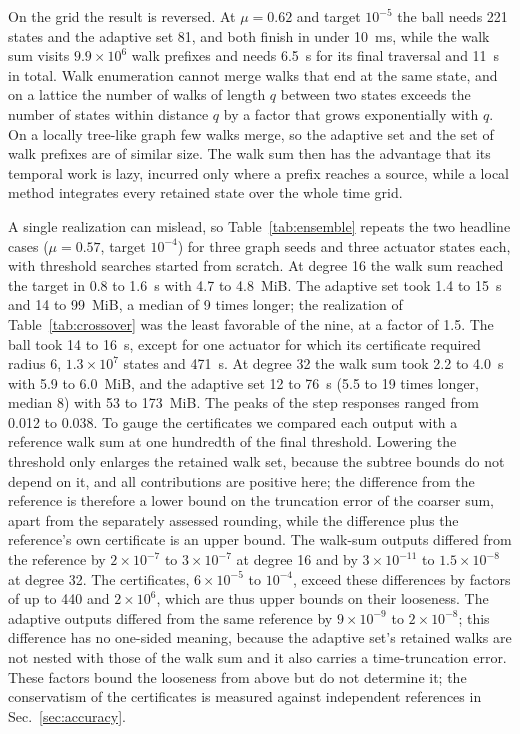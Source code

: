 \documentclass[aps,pra,superscriptaddress,floatfix,longbibliography,twocolumn]{revtex4-2}
\begin{document}
On the grid the result is reversed. At $\mu=0.62$ and target $10^{-5}$ the ball needs 221 states and the adaptive set 81, and both finish in under 10~ms, while the walk sum visits $9.9\times10^6$ walk prefixes and needs 6.5~s for its final traversal and 11~s in total. Walk enumeration cannot merge walks that end at the same state, and on a lattice the number of walks of length $q$ between two states exceeds the number of states within distance $q$ by a factor that grows exponentially with $q$. On a locally tree-like graph few walks merge, so the adaptive set and the set of walk prefixes are of similar size. The walk sum then has the advantage that its temporal work is lazy, incurred only where a prefix reaches a source, while a local method integrates every retained state over the whole time grid.

A single realization can mislead, so Table~\ref{tab:ensemble} repeats the two headline cases ($\mu=0.57$, target $10^{-4}$) for three graph seeds and three actuator states each, with threshold searches started from scratch. At degree 16 the walk sum reached the target in 0.8 to 1.6~s with 4.7 to 4.8~MiB. The adaptive set took 1.4 to 15~s and 14 to 99~MiB, a median of 9 times longer; the realization of Table~\ref{tab:crossover} was the least favorable of the nine, at a factor of 1.5. The ball took 14 to 16~s, except for one actuator for which its certificate required radius 6, $1.3\times10^7$ states and 471~s. At degree 32 the walk sum took 2.2 to 4.0~s with 5.9 to 6.0~MiB, and the adaptive set 12 to 76~s (5.5 to 19 times longer, median 8) with 53 to 173~MiB. The peaks of the step responses ranged from 0.012 to 0.038. To gauge the certificates we compared each output with a reference walk sum at one hundredth of the final threshold. Lowering the threshold only enlarges the retained walk set, because the subtree bounds do not depend on it, and all contributions are positive here; the difference from the reference is therefore a lower bound on the truncation error of the coarser sum, apart from the separately assessed rounding, while the difference plus the reference's own certificate is an upper bound. The walk-sum outputs differed from the reference by $2\times10^{-7}$ to $3\times10^{-7}$ at degree 16 and by $3\times10^{-11}$ to $1.5\times10^{-8}$ at degree 32. The certificates, $6\times10^{-5}$ to $10^{-4}$, exceed these differences by factors of up to 440 and $2\times10^6$, which are thus upper bounds on their looseness. The adaptive outputs differed from the same reference by $9\times10^{-9}$ to $2\times10^{-8}$; this difference has no one-sided meaning, because the adaptive set's retained walks are not nested with those of the walk sum and it also carries a time-truncation error. These factors bound the looseness from above but do not determine it; the conservatism of the certificates is measured against independent references in Sec.~\ref{sec:accuracy}.
\end{document}
